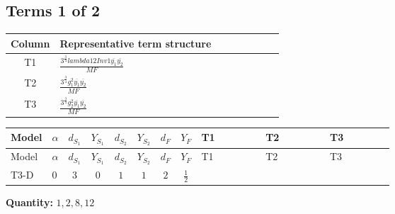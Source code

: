\documentclass[8pt]{article}
\begin{document}
\begin{landscape}
\subsection*{Terms 1 of 2}
\begin{center}
\begin{tabular}{@{}c >{\raggedright\arraybackslash}p{0.82\linewidth}@{}}
\toprule
Column & Representative term structure \\
\midrule
T1 & \(\displaystyle \frac{3^{\frac{3}{4}} lambda12Inv1 \overline{y_{1}} \overline{y_{2}}}{MF}\) \\
\midrule
T2 & \(\displaystyle \frac{3^{\frac{3}{4}} g_{1}^{2} \overline{y_{1}} \overline{y_{2}}}{MF}\) \\
\midrule
T3 & \(\displaystyle \frac{3^{\frac{3}{4}} g_{2}^{2} \overline{y_{1}} \overline{y_{2}}}{MF}\) \\
\midrule
\bottomrule
\end{tabular}
\end{center}
\smallskip
\tiny
\begin{longtable}{@{}llcccccc >{\raggedright\arraybackslash}p{0.21\linewidth} >{\raggedright\arraybackslash}p{0.21\linewidth} >{\raggedright\arraybackslash}p{0.21\linewidth}@{}}
\toprule
Model & $\alpha$ & $d_{S_1}$ & $Y_{S_1}$ & $d_{S_2}$ & $Y_{S_2}$ & $d_F$ & $Y_F$ & T1 & T2 & T3 \\
\midrule
\endfirsthead
\toprule
Model & $\alpha$ & $d_{S_1}$ & $Y_{S_1}$ & $d_{S_2}$ & $Y_{S_2}$ & $d_F$ & $Y_F$ & T1 & T2 & T3 \\
\midrule
\endhead
T3-D & $0$ & $3$ & $0$ & $1$ & $1$ & $2$ & $\frac{1}{2}$ & \scriptsize\adjustbox{max width=\linewidth}{$\begin{gathered} \frac{3^{\frac{3}{4}} lambda12Inv1 \overline{y_{1}} \overline{y_{2}}}{6 MF}\end{gathered}$} & \scriptsize\adjustbox{max width=\linewidth}{$\begin{gathered} \frac{3^{\frac{3}{4}} g_{1}^{2} \overline{y_{1}} \overline{y_{2}}}{8 MF}\end{gathered}$} & \scriptsize\adjustbox{max width=\linewidth}{$\begin{gathered} \frac{25 \cdot 3^{\frac{3}{4}} g_{2}^{2} \overline{y_{1}} \overline{y_{2}}}{24 MF}\end{gathered}$} \\
\midrule
\bottomrule
\end{longtable}
\clearpage
\noindent\textbf{Quantity: }$\mathrm{1,2,8,12}$\par\smallskip

\end{landscape}
\end{document}
